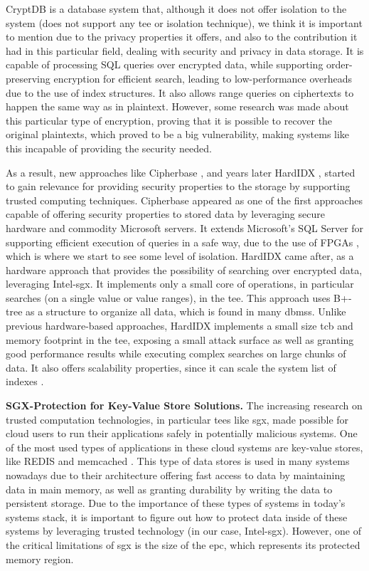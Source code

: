 CryptDB \cite{cryptDBPaper} is a database system that, although it does not offer isolation to the system (does not support any \gls{tee} or isolation technique), we think it is important to mention due to the privacy properties it offers, and also to the contribution it had in this particular field, dealing with security and privacy in data storage.
It is capable of processing SQL queries over encrypted data, while supporting order-preserving encryption for efficient search, leading to low-performance overheads due to the use of index structures. It also allows range queries on ciphertexts to happen the same way as in plaintext. However, some research  \cite{naveedPaper} was made about this particular type of encryption, proving that it is possible to recover the original plaintexts, which proved to be a big vulnerability, making systems like this incapable of providing the security needed.

As a result, new approaches like Cipherbase \cite{cipherbasePaper}, and years later HardIDX \cite{hardIDXPaper}, started to gain relevance for providing security properties to the storage by supporting trusted computing techniques.
Cipherbase appeared as one of the first approaches capable of offering security properties to stored data by leveraging secure hardware and commodity Microsoft servers. It extends Microsoft's SQL Server for supporting efficient execution of queries in a safe way, due to the use of FPGAs \cite{fpga}, which is where we start to see some level of isolation.
HardIDX came after, as a hardware approach that provides the possibility of searching over encrypted data, leveraging Intel-\gls{sgx}. It implements only a small core of operations, in particular searches (on a single value or value ranges), in the \gls{tee}.
This approach uses B+-tree as a structure to organize all data, which is found in many \gls{dbms}s.
Unlike previous hardware-based approaches, HardIDX implements a small size \gls{tcb} and memory footprint in the \gls{tee}, exposing a small attack surface as well as granting good performance results while executing complex searches on large chunks of data. It also offers scalability properties, since it can scale the system list of indexes \cite{hardIDXPaper}.\newline

\textbf{SGX-Protection for Key-Value Store Solutions.}
The increasing research on trusted computation technologies, in particular \gls{tee}s like \gls{sgx}, made possible for cloud users to run their applications safely in potentially malicious systems. One of the most used types of applications in these cloud systems are key-value stores, like REDIS \cite{redisWebsite} and memcached \cite{memcachedWebsite}. This type of data stores is used in many systems nowadays due to their architecture offering fast access to data by maintaining data in main memory, as well as granting durability by writing the data to persistent storage.  Due to the importance of these types of systems in today's systems stack, it is important to figure out how to protect data inside of these systems by leveraging trusted technology (in our case, Intel-\gls{sgx}). However, one of the critical limitations of \gls{sgx} is the size of the \gls{epc}, which represents its protected memory region. 

